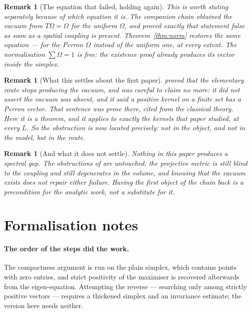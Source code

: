 \documentclass[11pt]{article}
\newtheorem{remark}[theorem]{Remark}
\theoremstyle{definition}
\newcommand{\Om}{\Omega}
\begin{document}
\begin{remark}[The equation that failed, holding again]
This is worth stating separately because of \emph{which} equation it is.  The
companion chain obtained the vacuum from $T\Om=\Om$ for the \emph{uniform}
$\Om$, and \cite{ErikssonSpatial} proved exactly that statement false as soon as
a spatial coupling is present.  Theorem~\ref{thm:norm} restores the same
equation --- for the Perron $\Om$ instead of the uniform one, at every extent.
The normalisation $\sum\Om=1$ is free: the existence proof already produces its
vector inside the simplex.
\end{remark}

\begin{remark}[What this settles about the first paper]
\cite{ErikssonSpatial} proved that the elementary route stops producing the
vacuum, and was careful to claim no more: it did not assert the vacuum was
absent, and it said a positive kernel on a finite set has a Perron vector.  That
sentence was prose there, cited from the classical theory.  Here it is a
theorem, and it applies to exactly the kernels that paper studied, at every $L$.
So the obstruction is now located precisely: not in the object, and not in the
model, but in the route.
\end{remark}

\begin{remark}[And what it does not settle]
Nothing in this paper produces a spectral gap.  The obstructions of
\cite{ErikssonBirkhoff} are untouched: the projective metric is still blind to
the coupling and still degenerates in the volume, and knowing that the vacuum
exists does not repair either failure.  Having the first object of the chain
back is a precondition for the analytic work, not a substitute for it.
\end{remark}

\section{Formalisation notes}

\paragraph{The order of the steps did the work.}  The compactness argument is
run on the plain simplex, which contains points with zero entries, and strict
positivity of the maximiser is recovered afterwards from the eigen-equation.
Attempting the reverse --- searching only among strictly positive vectors ---
requires a thickened simplex and an invariance estimate; the version here needs
neither.
\end{document}
